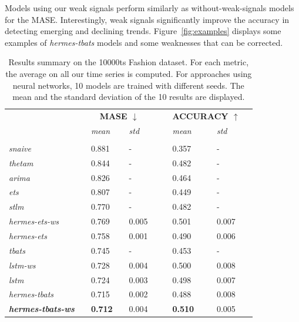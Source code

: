 \documentclass[10pt]{article} %
\begin{document}
Models using our weak signals perform similarly as without-weak-signals models for the MASE.  Interestingly, weak signals significantly improve the accuracy in detecting emerging and declining trends. Figure~\ref{fig:examples} displays some examples of \textit{hermes-tbats} models and some weaknesses that can be corrected.

\begin{table}
  \caption{Results summary on the 10000ts Fashion dataset. For each metric, the average on all our time series is computed. For approaches using neural networks, 10 models are trained with different seeds. The mean and the standard deviation of the 10 results are displayed.}
  \centering
  \begin{tabular}{l||lllll|lllll}
   &&\multicolumn{3}{c}{\textbf{MASE $\downarrow$}} &&& \multicolumn{3}{c}{\textbf{ACCURACY $\uparrow$}}&\\
    &&  \textit{mean}  && \textit{std} &&&  \textit{mean}  && \textit{std}& \\
	 \hline
	 &&&&&&&&&&\\
     \textit{snaive} && 0.881 && - &&& 0.357 && - &\\
     \textit{thetam}  && 0.844 && -&&& 0.482 && - &\\
     \textit{arima} && 0.826 && -&&& 0.464 && - & \\
     \textit{ets} && 0.807 && -&&& 0.449 && - & \\
     \textit{stlm} && 0.770 && -&&& 0.482 && - & \\
     \textit{hermes-ets-ws} && 0.769 && 0.005 &&& 0.501 && 0.007 &\\
     \textit{hermes-ets} && 0.758 && 0.001 &&& 0.490 && 0.006 &\\
     \textit{tbats} && 0.745 && -&&& 0.453 && - & \\
     \textit{lstm-ws} && 0.728 && 0.004 &&& 0.500 && 0.008 &\\
     \textit{lstm} && 0.724 && 0.003 &&& 0.498 && 0.007 &\\
     \textit{hermes-tbats} && 0.715 && 0.002 &&& 0.488 && 0.008 &\\
     \textbf{\textit{hermes-tbats-ws}} && \textbf{0.712} && 0.004 &&& \textbf{0.510} && 0.005 &\\
  \end{tabular}
\label{tab:metricresults}
\end{table}
\end{document}
